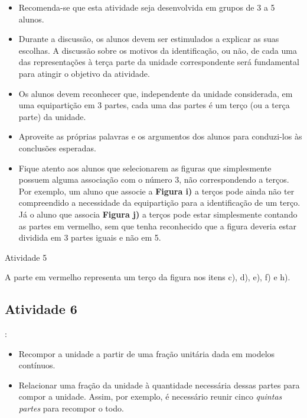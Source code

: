 \begin{multicols}{2}
   \vspace{.1cm}
\begin{itemize} %
    \item       Recomenda-se que esta atividade seja desenvolvida em grupos de 3 a 5 alunos.
    \item       Durante a discussão, os alunos devem ser estimulados a explicar as suas escolhas. A discussão sobre os motivos da identificação, ou não, de cada uma das representações à terça parte da unidade correspondente será fundamental para atingir o objetivo da atividade.
    \item       Os alunos devem reconhecer que, independente da unidade considerada, em uma equipartição em 3 partes, cada uma das partes é um terço (ou a terça parte) da unidade.
    \item       Aproveite as próprias palavras e os argumentos dos alunos para conduzi-los às conclusões esperadas.
    \item       Fique atento aos alunos que selecionarem as figuras que simplesmente possuem alguma associação com o número 3, não correspondendo a terços. Por exemplo, um aluno que associe a       {\bf Figura i)} a terços pode ainda não ter compreendido a necessidade da equipartição para a identificação de um terço. Já o aluno que associa       {\bf Figura j)}       a terços pode estar simplesmente contando as partes em vermelho, sem que tenha reconhecido que a figura deveria estar dividida em 3 partes iguais e não em 5.
\end{itemize} %





\begin{resposta*}{Atividade 5}

A parte em vermelho representa um terço da figura nos itens c), d), e), f) e h).
\end{resposta*}



\subsection{Atividade 6}
  \vspace{.1cm}:
\begin{itemize} %
    \item       Recompor a unidade a partir de uma fração unitária dada em modelos contínuos.
    \item       Relacionar uma fração da unidade à quantidade necessária dessas partes para compor a unidade. Assim, por exemplo, é necessário reunir cinco       {\it quintas partes}       para recompor o todo.
\end{itemize} %



\end{multicols}
